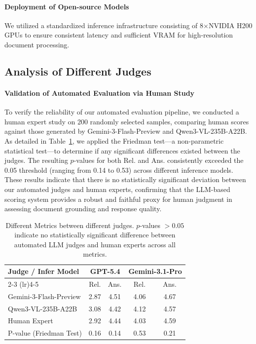 \documentclass{llmxive}
\begin{document}
{{{\paragraph{Deployment of Open-source Models}We utilized a standardized inference infrastructure consisting of 8$\times$NVIDIA H200 GPUs to ensure consistent latency and sufficient VRAM for high-resolution document processing.


\subsection{Analysis of Different Judges}
\label{Appendix: Analysis of Different Judges}

\paragraph{Validation of Automated Evaluation via Human Study}
To verify the reliability of our automated evaluation pipeline, we conducted a human expert study on 200 randomly selected samples, comparing human scores against those generated by Gemini-3-Flash-Preview and Qwen3-VL-235B-A22B. As detailed in Table~\ref{tab:model-eval}, we applied the Friedman test---a non-parametric statistical test---to determine if any significant differences existed between the judges. The resulting $p$-values for both Rel. and Ans. consistently exceeded the 0.05 threshold (ranging from 0.14 to 0.53) across different inference models. These results indicate that there is no statistically significant deviation between our automated judges and human experts, confirming that the LLM-based scoring system provides a robust and faithful proxy for human judgment in assessing document grounding and response quality.

\begin{table}[htbp]
\centering
\footnotesize
\begin{tabular}{lcccc}
\toprule
\multirow{2}{*}{Judge / Infer Model} & \multicolumn{2}{c}{GPT-5.4} & \multicolumn{2}{c}{Gemini-3.1-Pro} \\
\cmidrule(lr){2-3} \cmidrule(lr){4-5}
 & Rel. & Ans. & Rel. & Ans. \\
\midrule
Gemini-3-Flash-Preview & 2.87 & 4.51 & 4.06 & 4.67 \\
\addlinespace
Qwen3-VL-235B-A22B & 3.08 & 4.42 & 4.12 & 4.57 \\
\addlinespace
Human Expert & 2.92 & 4.44 & 4.03 & 4.59\\
\midrule
P-value (Friedman Test) & 0.16 & 0.14 & 0.53 & 0.21 \\
\bottomrule
\end{tabular}
\caption{Different Metrics between different judges. $p$-values $> 0.05$ indicate no statistically significant difference between automated LLM judges and human experts across all metrics.}
\label{tab:model-eval}
\end{table}

}}}
\end{document}
